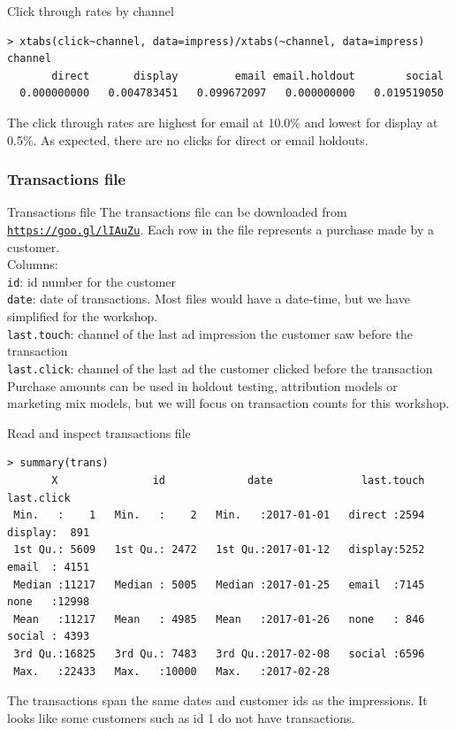 \documentclass[10pt, aspectratio=169]{beamer}
\begin{document}
\begin{frame}[fragile]{Click through rates by channel}
\begin{lstlisting}
> xtabs(click~channel, data=impress)/xtabs(~channel, data=impress)
channel
       direct       display         email email.holdout        social 
  0.000000000   0.004783451   0.099672097   0.000000000   0.019519050 
\end{lstlisting}
\alert{The click through rates are highest for email at 10.0\% and lowest for display at 0.5\%.  As expected, there are no clicks for direct or email holdouts.}
\end{frame}

\subsubsection{Transactions file}

\begin{frame}[fragile]{\alert{Transactions file}}
The transactions file can be downloaded from \href{https://goo.gl/lIAuZu}{\texttt{https://goo.gl/lIAuZu}}. Each row in the file represents a purchase made by a customer. \\
\bigskip
Columns: \\
\verb|id|: id number for the customer \\
\verb|date|: date of transactions. Most files would have a date-time, but we have simplified for the workshop.  \\
\verb|last.touch|: channel of the last ad impression the customer saw before the transaction\\
\verb|last.click|: channel of the last ad the customer clicked before the transaction\\
\bigskip
Purchase amounts can be used in holdout testing, attribution models or marketing mix models, but we will focus on transaction counts for this workshop.\\
\end{frame}

\begin{frame}[fragile]{Read and inspect \alert{transactions file}}
\begin{lstlisting}
> summary(trans)
       X               id             date              last.touch     last.click   
 Min.   :    1   Min.   :    2   Min.   :2017-01-01   direct :2594   display:  891  
 1st Qu.: 5609   1st Qu.: 2472   1st Qu.:2017-01-12   display:5252   email  : 4151  
 Median :11217   Median : 5005   Median :2017-01-25   email  :7145   none   :12998  
 Mean   :11217   Mean   : 4985   Mean   :2017-01-26   none   : 846   social : 4393  
 3rd Qu.:16825   3rd Qu.: 7483   3rd Qu.:2017-02-08   social :6596                  
 Max.   :22433   Max.   :10000   Max.   :2017-02-28  
\end{lstlisting}
\alert{The transactions span the same dates and customer ids as the impressions.  It looks like some customers such as id 1 do not have transactions.}
\end{frame}
\end{document}
